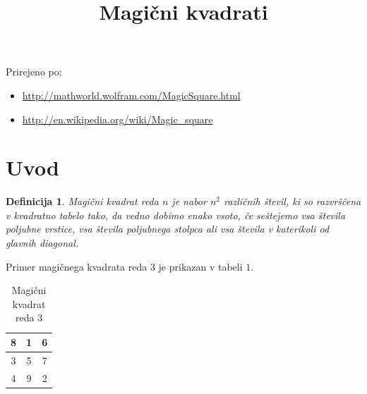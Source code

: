 \documentclass[a4paper,12pt]{article}
\author{}
\title{Magični kvadrati}
\date{}
\newtheorem{definicija}{Definicija}
\begin{document}
\maketitle

Prirejeno po:

\begin{itemize}
   \item \url{http://mathworld.wolfram.com/MagicSquare.html}
   \item \url{http://en.wikipedia.org/wiki/Magic_square }
\end{itemize}

\tableofcontents 












\newpage

\section{Uvod}
\begin{definicija}
   \emph{Magični kvadrat} reda \(n\) je nabor \(n^2\) različnih števil,
   ki so razvrščena v kvadratno tabelo tako, da vedno dobimo enako vsoto,
   če seštejemo vsa števila poljubne vrstice, vsa števila poljubnega
   stolpca ali vsa števila v katerikoli od glavnih diagonal.
\end{definicija}

Primer magičnega kvadrata reda 3 je prikazan v tabeli \(1\). %
\begin{table}
   \caption{Magični kvadrat reda 3}
   \label{etable:mag3}
   \large
   \centering
   \begin{tabular}{|c|c|c|}
   \hline
      8 & 1 & 6 \\\hline
      3 & 5 & 7 \\\hline
      4 & 9 & 2 \\\hline
   \end{tabular}
   \normalsize
\end{table}
   
\end{document}
